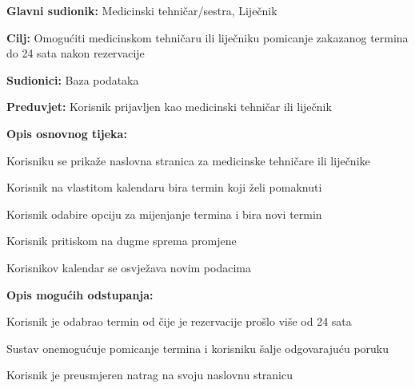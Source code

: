					\noindent {}
					\begin{packed_item}
	
						\item \textbf{Glavni sudionik: } Medicinski tehničar/sestra, Liječnik
						\item  \textbf{Cilj:} Omogućiti medicinskom tehničaru ili liječniku pomicanje zakazanog termina do 24 sata nakon rezervacije
						\item  \textbf{Sudionici:} Baza podataka
						\item  \textbf{Preduvjet:} Korisnik prijavljen kao medicinski tehničar ili liječnik
						\item  \textbf{Opis osnovnog tijeka:}
						
						\item[] \begin{packed_enum}
	
							\item Korisniku se prikaže naslovna stranica za medicinske tehničare ili liječnike
							\item Korisnik na vlastitom kalendaru bira termin koji želi pomaknuti
							\item Korisnik odabire opciju za mijenjanje termina i bira novi termin
							\item Korisnik pritiskom na dugme sprema promjene
							\item Korisnikov kalendar se osvježava novim podacima
							
						\end{packed_enum}
						\item  \textbf{Opis mogućih odstupanja:}
						
						\item[] \begin{packed_item}
	
							\item[2.a] Korisnik je odabrao termin od čije je rezervacije prošlo više od 24 sata
							\item[] \begin{packed_enum}
								
								\item Sustav onemogućuje pomicanje termina i korisniku šalje odgovarajuću poruku
								\item Korisnik je preusmjeren natrag na svoju naslovnu stranicu
						
							\end{packed_enum}
							
						\end{packed_item}
					\end{packed_item}
					
